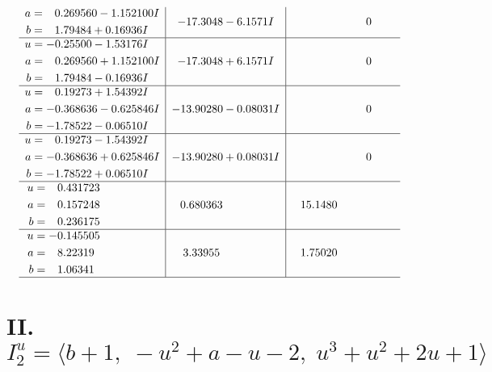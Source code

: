 \documentclass[1p]{elsarticle_modified}
\theoremstyle{definition}
\begin{document}
$$\begin{array}{c|c|c}
\begin{aligned}
a &= \phantom{-}0.269560 - 1.152100 I \\
b &= \phantom{-}1.79484 + 0.16936 I\end{aligned}
 & -17.3048 - 6.1571 I & \phantom{-0.000000 } 0 \\ \hline\begin{aligned}
u &= -0.25500 - 1.53176 I \\
a &= \phantom{-}0.269560 + 1.152100 I \\
b &= \phantom{-}1.79484 - 0.16936 I\end{aligned}
 & -17.3048 + 6.1571 I & \phantom{-0.000000 } 0 \\ \hline\begin{aligned}
u &= \phantom{-}0.19273 + 1.54392 I \\
a &= -0.368636 - 0.625846 I \\
b &= -1.78522 - 0.06510 I\end{aligned}
 & -13.90280 - 0.08031 I & \phantom{-0.000000 } 0 \\ \hline\begin{aligned}
u &= \phantom{-}0.19273 - 1.54392 I \\
a &= -0.368636 + 0.625846 I \\
b &= -1.78522 + 0.06510 I\end{aligned}
 & -13.90280 + 0.08031 I & \phantom{-0.000000 } 0 \\ \hline\begin{aligned}
u &= \phantom{-}0.431723\phantom{ +0.000000I} \\
a &= \phantom{-}0.157248\phantom{ +0.000000I} \\
b &= \phantom{-}0.236175\phantom{ +0.000000I}\end{aligned}
 & \phantom{-}0.680363\phantom{ +0.000000I} & \phantom{-}15.1480\phantom{ +0.000000I} \\ \hline\begin{aligned}
u &= -0.145505\phantom{ +0.000000I} \\
a &= \phantom{-}8.22319\phantom{ +0.000000I} \\
b &= \phantom{-}1.06341\phantom{ +0.000000I}\end{aligned}
 & \phantom{-}3.33955\phantom{ +0.000000I} & \phantom{-}1.75020\phantom{ +0.000000I}\\
 \hline 
 \end{array}$$\newpage\newpage\renewcommand{\arraystretch}{1}
\centering \section*{II. $I^u_{2}= \langle b+1,\;- u^2+a- u-2,\;u^3+u^2+2 u+1 \rangle$}
\end{document}
